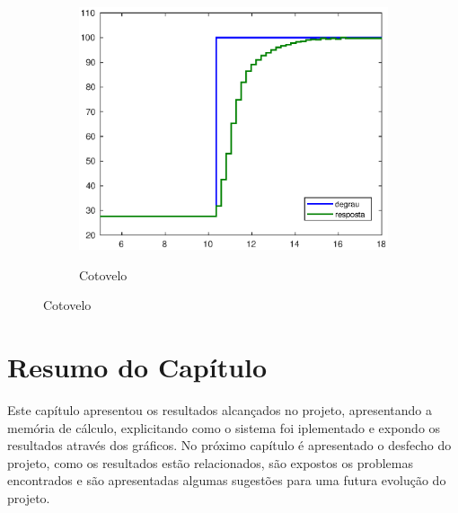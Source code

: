 \begin{figure}[h!]
\begin{subfigure}{.5\textwidth}
    \label{fig:shoulder_hilFase2}
  \end{subfigure}%
  \\[5ex]
  \begin{subfigure}{\textwidth}
    \centering
    \caption{Cotovelo}
    \includegraphics[width = 0.5\columnwidth]{Imagens/forearm_hilFase3}
    \label{fig:forearm_hilFase2}
  \end{subfigure}%
  
  \label{fig:hilFase3} 

\end{figure}

\section{Resumo do Capítulo}

Este capítulo apresentou os resultados alcançados no projeto, apresentando a memória de cálculo,
explicitando como o sistema foi iplementado e expondo os resultados através dos gráficos. No próximo
capítulo é apresentado o desfecho do projeto, como os resultados estão relacionados, são expostos 
os problemas encontrados e são apresentadas algumas sugestões para uma futura evolução do projeto.


\clearpage